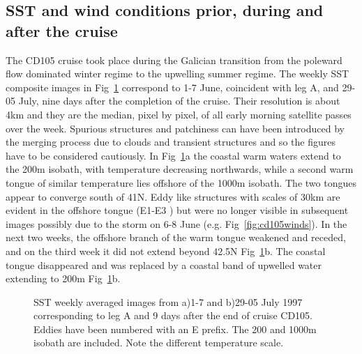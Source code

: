 \subsection{SST and wind conditions prior, during and after the cruise}
The CD105 cruise took place during the Galician transition from
the poleward flow dominated winter regime to the upwelling summer
regime. The weekly SST composite images in Fig~\ref{fig:cd105sst}
correspond to 1-7 June, coincident with leg A, and 29-05 July,
nine days after the completion of the cruise. Their resolution is
about 4km and they are the median, pixel by pixel, of all early
morning satellite passes over the week. Spurious structures and
patchiness can have been introduced by the merging process due to
clouds and transient structures and so the figures have to be
considered cautiously. In Fig~\ref{fig:cd105sst}a the coastal warm
waters extend to the 200m isobath, with temperature decreasing
northwards, while a second warm tongue of similar temperature lies
offshore of the 1000m isobath.  The two tongues appear to converge
south of 41\deg N. Eddy like structures with scales of 30km are
evident in the offshore tongue (E1-E3 ) but were no longer visible
in subsequent images possibly due to the storm on 6-8 June (e.g.
Fig~\ref{fig:cd105winds}). In the next two weeks, the offshore
branch of the warm tongue weakened and receded, and on the third
week it did not extend beyond 42.5\deg N Fig~\ref{fig:cd105sst}b.
The coastal tongue disappeared and was replaced by a coastal band
of upwelled water extending to 200m Fig~\ref{fig:cd105sst}b.

\subfiguretopcaptrue \subcapnoonelinetrue
\begin{figure}[t]
\centering {}%
\caption{SST weekly averaged images from a)1-7 and b)29-05 July
1997 corresponding to leg A and 9 days after the end of cruise
CD105. Eddies have been numbered with an E prefix. The 200 and
1000m isobath are included. Note the different temperature scale.}
\label{fig:cd105sst}\end{figure}

